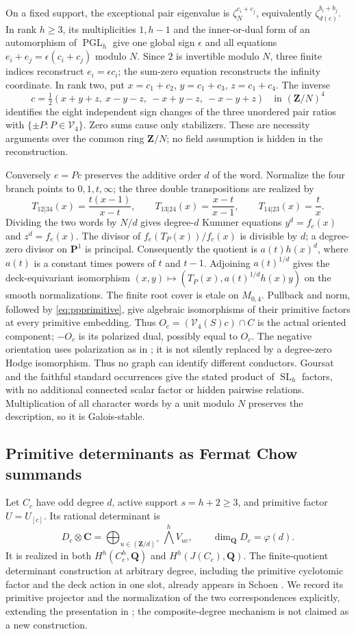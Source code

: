 \documentclass[11pt]{article}
\theoremstyle{definition}
\newcommand{\Q}{\mathbf Q}
\newcommand{\C}{\mathbf C}
\newcommand{\Z}{\mathbf Z}
\newcommand{\SL}{\operatorname{SL}}
\newcommand{\PGL}{\operatorname{PGL}}
\begin{document}
On a fixed support, the exceptional pair eigenvalue is
$\zeta_N^{c_i+c_j}$, equivalently
$\zeta_{d(c)}^{b_i+b_j}$. In rank $h\geq3$, its multiplicities
$1,h-1$ and the inner-or-dual form of an automorphism of $\PGL_h$
give one global sign $\epsilon$ and all equations
$e_i+e_j=\epsilon(c_i+c_j)$ modulo $N$. Since $2$ is invertible
modulo $N$, three finite indices reconstruct $e_i=\epsilon c_i$;
the sum-zero equation reconstructs the infinity coordinate.
In rank two, put $x=c_1+c_2$, $y=c_1+c_3$, $z=c_1+c_4$. The inverse
\[
 c=\tfrac12(x+y+z,\ x-y-z,\ -x+y-z,\ -x-y+z)
 \quad\text{in }(\Z/N)^4
\]
identifies the eight independent sign changes of the three unordered
pair ratios with $\{\pm P:P\in\mathcal V_4\}$. Zero sums cause
only stabilizers. These are necessity arguments over the common ring
$\Z/N$; no field assumption is hidden in the reconstruction.

Conversely $e=Pc$ preserves the additive order $d$ of the word.
Normalize the four branch points to $0,1,t,\infty$; the three
double transpositions are realized by
\[
 T_{12|34}(x)=\frac{t(x-1)}{x-t},\qquad
 T_{13|24}(x)=\frac{x-t}{x-1},\qquad T_{14|23}(x)=\frac{t}{x}.
\]
Dividing the two words by $N/d$ gives degree-$d$ Kummer equations
$y^d=f_c(x)$ and $z^d=f_e(x)$. The divisor of
$f_e(T_P(x))/f_c(x)$ is divisible by $d$; a degree-zero divisor on
$\mathbf P^1$ is principal. Consequently the quotient is
$a(t)h(x)^d$, where $a(t)$ is a constant times powers of $t$ and
$t-1$. Adjoining $a(t)^{1/d}$ gives the deck-equivariant isomorphism
$(x,y)\mapsto(T_P(x),a(t)^{1/d}h(x)y)$ on the smooth normalizations.
The finite root cover is etale on $M_{0,4}$. Pullback and
norm, followed by \eqref{eq:ppprimitive}, give algebraic isomorphisms
of their primitive factors at every primitive embedding. Thus
$O_c=(\mathcal V_4(S)c)\cap C$ is the actual oriented component;
$-O_c$ is its polarized dual, possibly equal to $O_c$. The negative
orientation uses polarization as in \cite{General}; it is not silently
replaced by a degree-zero Hodge isomorphism. Thus no graph can identify
different conductors. Goursat and the faithful standard occurrences give
the stated product of $\SL_h$ factors, with no additional connected
scalar factor or hidden pairwise relations.
Multiplication of all character words by a unit modulo $N$ preserves
the description, so it is Galois-stable.

\subsection{Primitive determinants as Fermat Chow summands}
Let $C_c$ have odd degree $d$, active support $s=h+2\geq3$, and primitive
factor $U=U_{[c]}$. Its rational determinant is
\[
 D_c\otimes\C=
 \bigoplus_{u\in(\Z/d)^\times}\bigwedge^h V_{uc},
 \qquad \dim_\Q D_c=\varphi(d).
\]
It is realized in both $H^h(C_c^h,\Q)$ and $H^h(J(C_c),\Q)$.
The finite-quotient determinant construction at arbitrary degree,
including the primitive cyclotomic factor and the deck action in one
slot, already appears in Schoen \cite[Lemmas~1.1--1.2, pp.~5--6]{Schoen}.
We record its primitive projector and the normalization of the two
correspondences explicitly, extending the presentation in \cite{Fermat};
the composite-degree mechanism is not claimed as a new construction.
\end{document}
